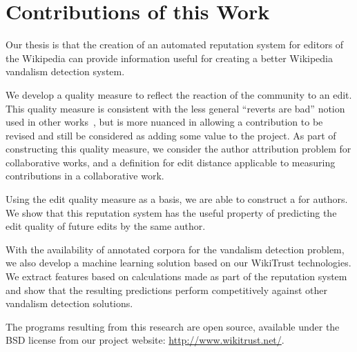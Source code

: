 \section{Contributions of this Work}

Our thesis is that the creation of an automated reputation system
for editors of the Wikipedia can provide information useful for
creating a better Wikipedia vandalism detection system.

We develop a quality measure to reflect the reaction of
the community to an edit.
This quality measure is consistent with the less general
``reverts are bad'' notion used in other
works~\cite{Smets2008,Itakura2009,Belani2010,West2010},
but is more nuanced in allowing a contribution to be revised
and still be considered as adding some value to the project.
As part of constructing this quality measure, we consider the
author attribution problem for collaborative works,
and a definition for edit distance applicable to
measuring contributions in a collaborative work.

Using the edit quality measure as a basis, we are able
to construct a  for authors.
We show that this reputation system has the useful property
of predicting the edit quality of future edits by the same
author.

With the availability of annotated corpora for the vandalism
detection problem, we also develop a machine learning solution based on our
WikiTrust technologies.
We extract features based on calculations made as part of the
reputation system and show that the resulting predictions perform
competitively against other vandalism detection solutions.

The programs resulting from this research are open source,
available under the BSD license from our project website:
\url{http://www.wikitrust.net/}.

